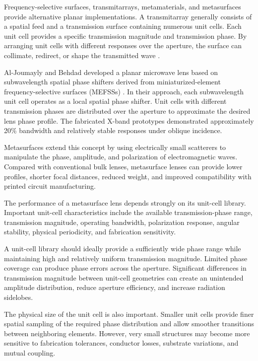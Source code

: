 Frequency-selective surfaces, transmitarrays, metamaterials, and
metasurfaces provide alternative planar implementations. A
transmitarray generally consists of a spatial feed and a transmission
surface containing numerous unit cells. Each unit cell provides a
specific transmission magnitude and transmission phase. By arranging
unit cells with different responses over the aperture, the surface can
collimate, redirect, or shape the transmitted wave
\cite{Song2026}.

Al-Joumayly and Behdad developed a planar microwave lens based on
subwavelength spatial phase shifters derived from miniaturized-element
frequency-selective surfaces (MEFSSs) \cite{Al-Joumayly2011}. In their
approach, each subwavelength unit cell operates as a local spatial
phase shifter. Unit cells with different transmission phases are
distributed over the aperture to approximate the desired lens phase
profile. The fabricated X-band prototypes demonstrated approximately
20\% bandwidth and relatively stable responses under oblique
incidence.

Metasurfaces extend this concept by using electrically small
scatterers to manipulate the phase, amplitude, and polarization of
electromagnetic waves. Compared with conventional bulk lenses,
metasurface lenses can provide lower profiles, shorter focal
distances, reduced weight, and improved compatibility with printed
circuit manufacturing.

The performance of a metasurface lens depends strongly on its
unit-cell library. Important unit-cell characteristics include the
available transmission-phase range, transmission magnitude,
operating bandwidth, polarization response, angular stability,
physical periodicity, and fabrication sensitivity.

A unit-cell library should ideally provide a sufficiently wide phase
range while maintaining high and relatively uniform transmission
magnitude. Limited phase coverage can produce phase errors across the
aperture. Significant differences in transmission magnitude between
unit-cell geometries can create an unintended amplitude distribution,
reduce aperture efficiency, and increase radiation sidelobes.

The physical size of the unit cell is also important. Smaller unit
cells provide finer spatial sampling of the required phase
distribution and allow smoother transitions between neighboring
elements. However, very small structures may become more sensitive to
fabrication tolerances, conductor losses, substrate variations, and
mutual coupling.

